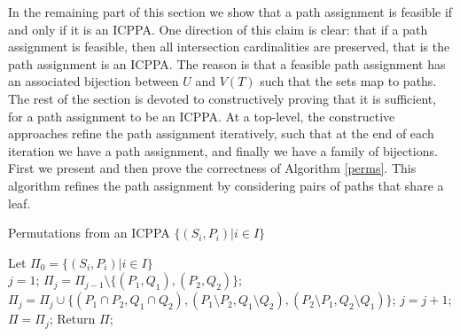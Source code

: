 \documentclass{llncs}
\begin{document}
\noindent
In the remaining part of this section we show that a path assignment
is feasible if and only if it is an ICPPA.  One direction of this
claim is clear: that if a path assignment is feasible, then all
intersection cardinalities are preserved, that is the path assignment
is an ICPPA.  The reason is that a feasible path assignment has an
associated bijection between $U$ and $V(T)$ such that the sets map to
paths.  The rest of the section is devoted to constructively proving
that it is sufficient, for a path assignment to be an ICPPA.  At a
top-level, the constructive approaches refine the path assignment
iteratively, such that at the end of each iteration we have a path
assignment, and finally we have a family of bijections.  First we
present and then prove the correctness of Algorithm \ref{perms}.  This
algorithm refines the path assignment by considering pairs of paths
that share a leaf.

\begin{algorithm}[h]
\caption{Permutations from an ICPPA $\{(S_i,P_i) | i \in I\}$}
\label{perms}
\begin{algorithmic}
\STATE Let $\Pi_0=\{(S_i,P_i)| i \in I\}$\\
\STATE $j = 1$;
\label{shareleaf} 
\STATE $\Pi_j=   \Pi_{j-1} \setminus \{(P_1,Q_1),(P_2,Q_2)\}$;
\label{setbreak}\STATE $\Pi_j = \Pi_j \cup \{(P_1 \cap P_2,Q_1 \cap Q_2), (P_1 \setminus P_2,Q_1 \setminus Q_2), (P_2 \setminus P_1, Q_2 \setminus Q_1)\}$;
\STATE $j = j+1$;
\ENDWHILE
\STATE $\Pi = \Pi_j$;
\STATE Return $\Pi$;
\end{algorithmic}
\end{algorithm}
\end{document}
